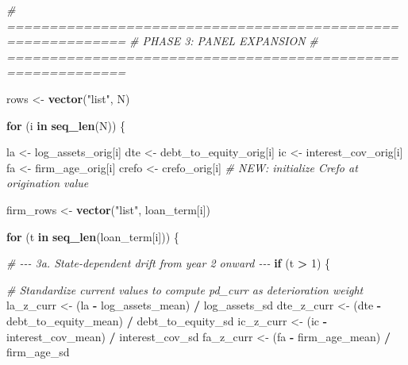 \documentclass[
]{article}
\newenvironment{Shaded}{\begin{snugshade}}{\end{snugshade}}
\newcommand{\CommentTok}[1]{\textcolor[rgb]{0.56,0.35,0.01}{\textit{#1}}}
\newcommand{\ControlFlowTok}[1]{\textcolor[rgb]{0.13,0.29,0.53}{\textbf{#1}}}
\newcommand{\DecValTok}[1]{\textcolor[rgb]{0.00,0.00,0.81}{#1}}
\newcommand{\FunctionTok}[1]{\textcolor[rgb]{0.13,0.29,0.53}{\textbf{#1}}}
\newcommand{\NormalTok}[1]{#1}
\newcommand{\OtherTok}[1]{\textcolor[rgb]{0.56,0.35,0.01}{#1}}
\newcommand{\SpecialCharTok}[1]{\textcolor[rgb]{0.81,0.36,0.00}{\textbf{#1}}}
\newcommand{\StringTok}[1]{\textcolor[rgb]{0.31,0.60,0.02}{#1}}
\begin{document}
\begin{Shaded}
\begin{Highlighting}[]
  \CommentTok{\# ============================================================}
  \CommentTok{\# PHASE 3: PANEL EXPANSION}
  \CommentTok{\# ============================================================}
  
\NormalTok{  rows }\OtherTok{\textless{}{-}} \FunctionTok{vector}\NormalTok{(}\StringTok{"list"}\NormalTok{, N)}
  
  \ControlFlowTok{for}\NormalTok{ (i }\ControlFlowTok{in} \FunctionTok{seq\_len}\NormalTok{(N)) \{}
    
\NormalTok{    la    }\OtherTok{\textless{}{-}}\NormalTok{ log\_assets\_orig[i]}
\NormalTok{    dte   }\OtherTok{\textless{}{-}}\NormalTok{ debt\_to\_equity\_orig[i]}
\NormalTok{    ic    }\OtherTok{\textless{}{-}}\NormalTok{ interest\_cov\_orig[i]}
\NormalTok{    fa    }\OtherTok{\textless{}{-}}\NormalTok{ firm\_age\_orig[i]}
\NormalTok{    crefo }\OtherTok{\textless{}{-}}\NormalTok{ crefo\_orig[i]           }\CommentTok{\# NEW: initialize Crefo at origination value}
    
\NormalTok{    firm\_rows }\OtherTok{\textless{}{-}} \FunctionTok{vector}\NormalTok{(}\StringTok{"list"}\NormalTok{, loan\_term[i])}
    
    \ControlFlowTok{for}\NormalTok{ (t }\ControlFlowTok{in} \FunctionTok{seq\_len}\NormalTok{(loan\_term[i])) \{}
      
      \CommentTok{\# {-}{-}{-} 3a. State{-}dependent drift from year 2 onward {-}{-}{-}}
      \ControlFlowTok{if}\NormalTok{ (t }\SpecialCharTok{\textgreater{}} \DecValTok{1}\NormalTok{) \{}
        
        \CommentTok{\# Standardize current values to compute pd\_curr as deterioration weight}
\NormalTok{        la\_z\_curr  }\OtherTok{\textless{}{-}}\NormalTok{ (la  }\SpecialCharTok{{-}}\NormalTok{ log\_assets\_mean)     }\SpecialCharTok{/}\NormalTok{ log\_assets\_sd}
\NormalTok{        dte\_z\_curr }\OtherTok{\textless{}{-}}\NormalTok{ (dte }\SpecialCharTok{{-}}\NormalTok{ debt\_to\_equity\_mean) }\SpecialCharTok{/}\NormalTok{ debt\_to\_equity\_sd}
\NormalTok{        ic\_z\_curr  }\OtherTok{\textless{}{-}}\NormalTok{ (ic  }\SpecialCharTok{{-}}\NormalTok{ interest\_cov\_mean)   }\SpecialCharTok{/}\NormalTok{ interest\_cov\_sd}
\NormalTok{        fa\_z\_curr  }\OtherTok{\textless{}{-}}\NormalTok{ (fa  }\SpecialCharTok{{-}}\NormalTok{ firm\_age\_mean)        }\SpecialCharTok{/}\NormalTok{ firm\_age\_sd}
        

\end{Highlighting}
\end{Shaded}
\end{document}
